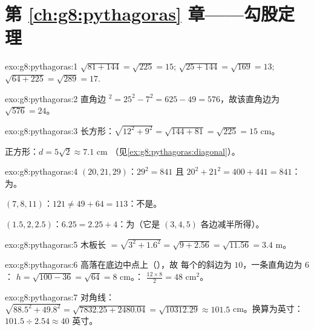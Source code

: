 \section*{第 \ref{ch:g8:pythagoras} 章——勾股定理}

\begin{solution}{exo:g8:pythagoras:1}
$\sqrt{81 + 144} = \sqrt{225} = 15$; \quad
$\sqrt{25 + 144} = \sqrt{169} = 13$; \quad
$\sqrt{64 + 225} = \sqrt{289} = 17$.
\end{solution}

\begin{solution}{exo:g8:pythagoras:2}
直角边 $^2 = 25^2 - 7^2 = 625 - 49 = 576$，故该直角边为
$\sqrt{576} = 24$。
\end{solution}

\begin{solution}{exo:g8:pythagoras:3}
长方形：$\sqrt{12^2 + 9^2} = \sqrt{144 + 81} = \sqrt{225} = 15$
cm。

正方形：$d = 5\sqrt2 \approx 7.1$ cm
（见\cref{ex:g8:pythagoras:diagonal}）。
\end{solution}

\begin{solution}{exo:g8:pythagoras:4}
$(20, 21, 29)$：$29^2 = 841$ 且 $20^2 + 21^2 = 400 + 441 = 841$：
为。

$(7, 8, 11)$：$121 \neq 49 + 64 = 113$：不是。

$(1.5, 2, 2.5)$：$6.25 = 2.25 + 4$：为（它是
$(3,4,5)$ 各边减半所得）。
\end{solution}

\begin{solution}{exo:g8:pythagoras:5}
木板长 $= \sqrt{3^2 + 1.6^2} = \sqrt{9 + 2.56} = \sqrt{11.56} = 3.4$
m。
\end{solution}

\begin{solution}{exo:g8:pythagoras:6}
高落在底边中点上（），故
每个的斜边为 $10$，一条直角边为 $6$：
$h = \sqrt{100 - 36} = \sqrt{64} = 8$ cm。：
$\frac{12 \times 8}{2} = 48$ cm$^2$。
\end{solution}

\begin{solution}{exo:g8:pythagoras:7}
对角线：$\sqrt{88.5^2 + 49.8^2} = \sqrt{7832.25 + 2480.04}
= \sqrt{10312.29} \approx 101.5$ cm。换算为英寸：
$101.5 \div 2.54 \approx 40$ 英寸。
\end{solution}


